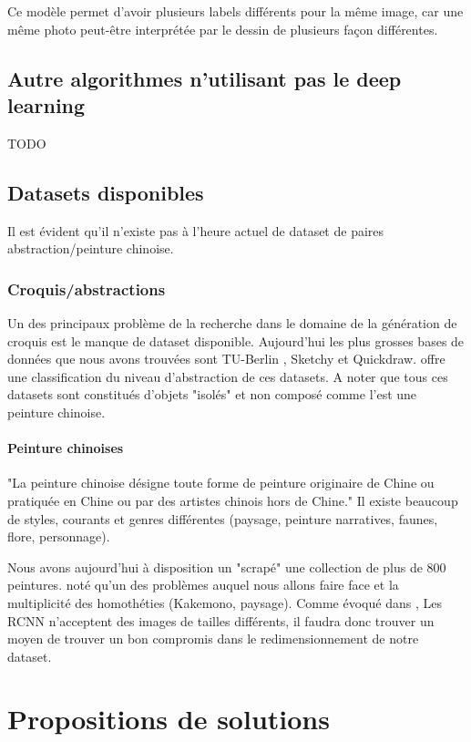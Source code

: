 \documentclass[a4paper, 12pt]{book}
\begin{document}
Ce modèle permet d'avoir plusieurs labels différents pour la même image, car une même photo peut-être interprétée par le dessin de plusieurs façon différentes.

\section{Autre algorithmes n'utilisant pas le deep learning}
TODO


\section{Datasets disponibles}
Il est évident qu'il n'existe pas à l'heure actuel de dataset de paires abstraction/peinture chinoise.

\subsection{Croquis/abstractions}
Un des principaux problème de la recherche dans le domaine de la génération de croquis est le manque de dataset disponible. Aujourd'hui les plus grosses bases de données que nous avons trouvées sont TU-Berlin \cite{eitz2012hdhso}, Sketchy \cite{sketchy2016} et Quickdraw. \cite{DBLP:journals/corr/abs-1901-00542} offre une classification du niveau d'abstraction de ces datasets. A noter que tous ces datasets sont constitués d'objets "isolés" et non composé comme l'est une peinture chinoise.

\subsubsection{Peinture chinoises}
"La peinture chinoise désigne toute forme de peinture originaire de Chine ou pratiquée en Chine ou par des artistes chinois hors de Chine." \cite{wiki:Peinture-chinoise} Il existe beaucoup de styles, courants et genres différentes (paysage, peinture narratives, faunes, flore, personnage). 

Nous avons aujourd'hui à disposition un "scrapé" une collection de plus de 800 peintures.  noté qu'un des problèmes auquel nous allons faire face et la multiplicité des homothéties (Kakemono, paysage). Comme évoqué dans \cite{}, Les RCNN n'acceptent des images de tailles différents, il faudra donc trouver un moyen de trouver un bon compromis dans le redimensionnement de notre dataset.


\chapter{Propositions de solutions}
\end{document}
